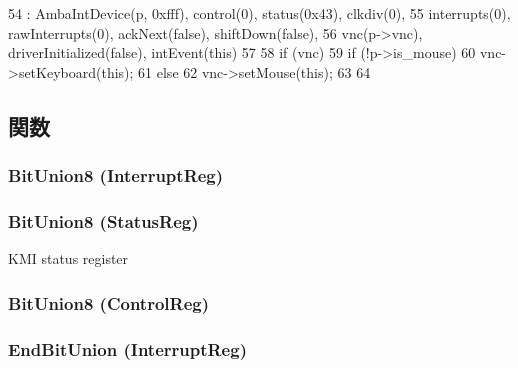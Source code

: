 \begin{DoxyCode}
54     : AmbaIntDevice(p, 0xfff), control(0), status(0x43), clkdiv(0),
55       interrupts(0), rawInterrupts(0), ackNext(false), shiftDown(false),
56       vnc(p->vnc), driverInitialized(false), intEvent(this)
57 {
58     if (vnc) {
59         if (!p->is_mouse)
60             vnc->setKeyboard(this);
61         else
62             vnc->setMouse(this);
63     }
64 }
\end{DoxyCode}


\subsection{関数}
\hypertarget{classPl050_aaad187ce47ad27fa2f7b32559402bc3e}{
\subsubsection[{BitUnion8}]{\setlength{\rightskip}{0pt plus 5cm}BitUnion8 (InterruptReg)}}
\label{classPl050_aaad187ce47ad27fa2f7b32559402bc3e}
\hypertarget{classPl050_a8d38b04829a0d44ca73abac2d923445e}{
\subsubsection[{BitUnion8}]{\setlength{\rightskip}{0pt plus 5cm}BitUnion8 (StatusReg)}}
\label{classPl050_a8d38b04829a0d44ca73abac2d923445e}
KMI status register \hypertarget{classPl050_a12eff01be6a763bdde7517ade0fb4c3b}{
\subsubsection[{BitUnion8}]{\setlength{\rightskip}{0pt plus 5cm}BitUnion8 (ControlReg)}}
\label{classPl050_a12eff01be6a763bdde7517ade0fb4c3b}
\hypertarget{classPl050_a429076a6961a34396291ae1f31258c78}{
\subsubsection[{EndBitUnion}]{\setlength{\rightskip}{0pt plus 5cm}EndBitUnion (InterruptReg)}}
